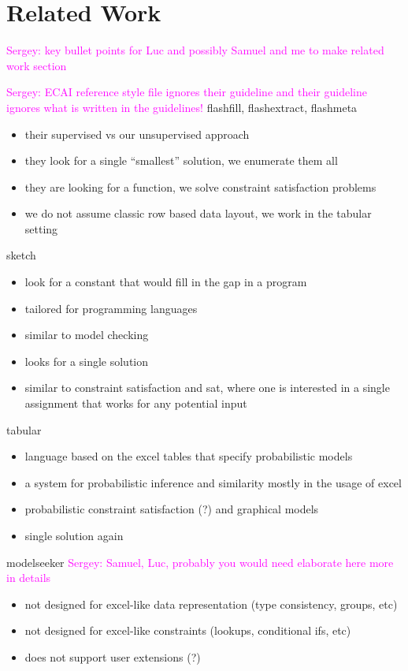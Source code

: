 \documentclass{ecai}
\newcommand{\sergey}[1]{\textcolor{magenta}{{\sc Sergey:} #1}\xspace}
\begin{document}
\section{Related Work}
\sergey{key bullet points for Luc and possibly Samuel and me to make related work section}

\sergey{ECAI reference style file ignores their guideline and their guideline ignores what is written in the guidelines!}
flashfill, flashextract, flashmeta \cite{flashfill,flashextract,flashmeta}
\begin{itemize}
  \item their supervised vs our unsupervised approach
  \item they look for a single ``smallest'' solution, we enumerate them all
  \item they are looking for a function, we solve constraint satisfaction problems
  \item we do not assume classic row based data layout, we work in the tabular setting
\end{itemize}

sketch \cite{sketch}
\begin{itemize}
  \item look for a constant that would fill in the gap in a program
  \item tailored for programming languages
  \item similar to model checking
  \item looks for a single solution
  \item similar to constraint satisfaction and sat, where one is interested in a single assignment that works for any potential input
\end{itemize}

tabular \cite{tabular}
\begin{itemize}
  \item language based on the excel tables that specify probabilistic models
  \item a system for probabilistic inference and similarity mostly in the usage of excel
  \item probabilistic constraint satisfaction (?) and graphical models
  \item single solution again
\end{itemize}

modelseeker \cite{modelseeker} \sergey{Samuel, Luc, probably you would need elaborate here more in details}

\begin{itemize}
  \item not designed for excel-like data representation (type consistency, groups, etc)
  \item not designed for excel-like constraints (lookups, conditional ifs, etc)
  \item does not support user extensions (?)
\end{itemize}
\end{document}
